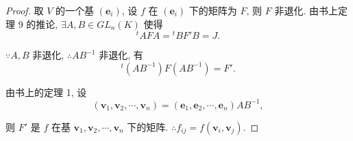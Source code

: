 \documentclass[color=black,device=normal,lang=cn,mode=geye]{elegantnote}
\begin{document}
\begin{proof}
    取 $V$ 的一个基 $(\boldsymbol{e}_i)$, 设 $f$ 在 $(\boldsymbol{e}_i)$ 下的矩阵为 $F$, 则 $F$ 非退化. 由书上定理 9 的推论, $\exists A,B\in GL _n(K)$ 使得
    \[{}^tAFA={}^tBF'B=J.\]

    $\because A,B$ 非退化, $\therefore AB^{-1}$ 非退化, 有
    \[{}^t(AB^{-1})F(AB^{-1})=F'.\]

    由书上的定理 1, 设
    \[(\boldsymbol{v}_1,\boldsymbol{v}_2,\cdots,\boldsymbol{v}_n)=(\boldsymbol{e}_1,\boldsymbol{e}_2,\cdots,\boldsymbol{e}_n)AB^{-1},\]

    则 $F'$ 是 $f$ 在基 $\boldsymbol{v}_1,\boldsymbol{v}_2,\cdots,\boldsymbol{v}_n$ 下的矩阵. $\therefore f_{ij}=f(\boldsymbol{v}_i,\boldsymbol{v}_j)$.
\end{proof}
\end{document}
